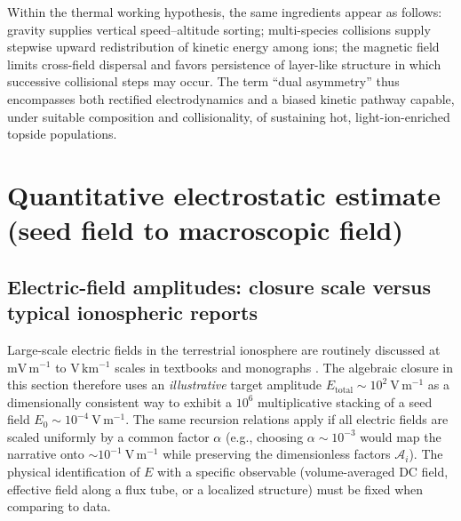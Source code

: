 \documentclass[11pt,a4paper]{article}
\begin{document}
Within the thermal working hypothesis, the same ingredients appear as follows: gravity supplies vertical speed--altitude sorting; multi-species collisions supply stepwise upward redistribution of kinetic energy among ions; the magnetic field limits cross-field dispersal and favors persistence of layer-like structure in which successive collisional steps may occur. The term ``dual asymmetry'' thus encompasses both rectified electrodynamics and a biased kinetic pathway capable, under suitable composition and collisionality, of sustaining hot, light-ion-enriched topside populations.

\section{Quantitative electrostatic estimate (seed field to macroscopic field)}
\subsection{Electric-field amplitudes: closure scale versus typical ionospheric reports}
\label{sec:efield-scales}
Large-scale electric fields in the terrestrial ionosphere are routinely discussed at $\mathrm{mV\,m^{-1}}$ to $\mathrm{V\,km^{-1}}$ scales in textbooks and monographs \cite{Kelley2009EarthIonosphere,SchunkNagy2009IonospherePhysics}. The algebraic closure in this section therefore uses an \emph{illustrative} target amplitude $E_{\mathrm{total}}\sim 10^2\ \mathrm{V\,m^{-1}}$ as a dimensionally consistent way to exhibit a $10^6$ multiplicative stacking of a seed field $E_0\sim 10^{-4}\ \mathrm{V\,m^{-1}}$. The same recursion relations apply if all electric fields are scaled uniformly by a common factor $\alpha$ (e.g., choosing $\alpha\sim 10^{-3}$ would map the narrative onto $\sim 10^{-1}\ \mathrm{V\,m^{-1}}$ while preserving the dimensionless factors $\mathcal{A}_i$). The physical identification of $E$ with a specific observable (volume-averaged DC field, effective field along a flux tube, or a localized structure) must be fixed when comparing to data.
\end{document}

